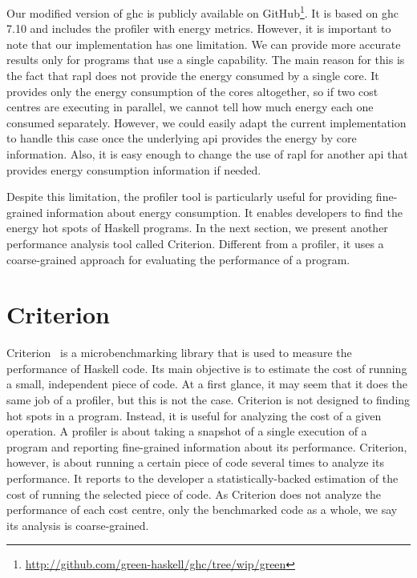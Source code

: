 Our modified version of \ac{ghc} is publicly available on GitHub\footnote{\url{http://github.com/green-haskell/ghc/tree/wip/green}}. It is based on \ac{ghc} 7.10 and includes the profiler with energy metrics. However, it is important to note that our implementation has one limitation. We can provide more accurate results only for programs that use a single capability. The main reason for this is the fact that \ac{rapl} does not provide the energy consumed by a single core. It provides only the energy consumption of the cores altogether, so if two cost centres are executing in parallel, we cannot tell how much energy each one consumed separately. However, we could easily adapt the current implementation to handle this case once the underlying \ac{api} provides the energy by core information. Also, it is easy enough to change the use of \ac{rapl} for another \ac{api} that provides energy consumption information if needed.

Despite this limitation, the profiler tool is particularly useful for providing fine-grained information about energy consumption. It enables developers to find the energy hot spots of Haskell programs. In the next section, we present another performance analysis tool called Criterion. Different from a profiler, it uses a coarse-grained approach for evaluating the performance of a program.


\section{Criterion}\label{sec:criterion}
Criterion~\citep{sullivan:2009} is a microbenchmarking library that is used to measure the performance of Haskell code. Its main objective is to estimate the cost of running a small, independent piece of code. At a first glance, it may seem that it does the same job of a profiler, but this is not the case. Criterion is not designed to finding hot spots in a program. Instead, it is useful for analyzing the cost of a given operation. A profiler is about taking a snapshot of a single execution of a program and reporting fine-grained information about its performance. Criterion, however, is about running a certain piece of code several times to analyze its performance. It reports to the developer a statistically-backed estimation of the cost of running the selected piece of code. As Criterion does not analyze the performance of each cost centre, only the benchmarked code as a whole, we say its analysis is coarse-grained.

